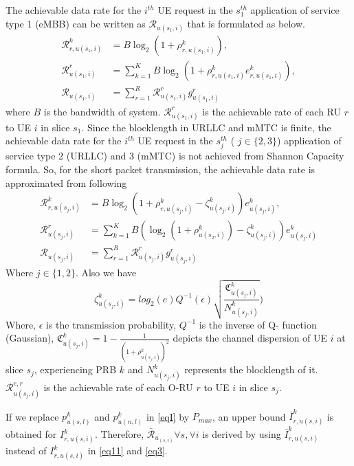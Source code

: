 \documentclass[conference]{IEEEtran}
\begin{document}
The achievable data rate for the $i^{th}$ UE request in the $s_{1}^{th}$ application of service type 1 (eMBB) can be written as $\mathcal{R}_{u(s_1,i)}$ that is formulated as below.
\begin{equation}\label{eq3}
\begin{split}
\mathcal{{R}}_{r,u(s_1,i)}^{k} &=  B \log_2({1+ \rho_{r,u(s_1,i)}^{k}}) ,\\
\mathcal{R}_{u(s_1,i)}^{r} &= \sum_{k=1}^{K} B \log_2({1+ \rho_{r,u(s_1,i)}^{k}} e^k_{r,u(s_1,i)}),\\
\mathcal{R}_{u(s_1,i)} &= \sum_{r=1}^{R}\mathcal{R}_{u(s_1,i)}^{r} g^r_{u(s_1,i)}
\end{split}
\end{equation}
where $B$ is the bandwidth of system. 
$\mathcal{R}_{u(s_1,i)}^{r}$ is the achievable rate of each RU $r$ to UE $i$ in slice $s_1$.
Since the blocklength in URLLC and mMTC is finite, the achievable data rate for the $i^{th}$ UE request in the $s_{j}^{th}$ ( $j \in \{2,3\}$) application of service type 2 (URLLC) and 3 (mMTC) is not achieved from Shannon Capacity formula. So, for the short packet transmission, the achievable data rate is approximated from following
\begin{equation}\label{eq11}
\begin{split}
\mathcal{{R}}_{r,u(s_j,i)}^{k} &= B \log_2({1+ \rho_{r,u(s_j,i)}^{k}} - \zeta_{u(s_j,i)}^{k}){e}_{u(s_j,i)}^{k},\\
\mathcal{R}_{u(s_j,i)}^{r} &= \sum_{k=1}^{K} B (\log_2({1+ \rho_{u(s_2,i)}^{k}})- \zeta_{u(s_j,i)}^{k}){e}_{u(s_j,i)}^{k}\\
\mathcal{R}_{u(s_j,i)} &= \sum_{r=1}^{R}\mathcal{R}_{u(s_j,i)}^{r} g^r_{u(s_j,i)}
\end{split}
\end{equation}
Where $j \in \{1,2\}$. Also we have
\begin{equation}\label{shortPacket}
 \zeta_{u(s_j,i)}^{k} = log_2({e})Q^{-1}(\epsilon) \sqrt{\frac{\mathfrak{C}_{u(s_j,i)}^{k}}{N_{u(s_j,i)}^{k}}})
\end{equation}
Where, $\epsilon $ is the transmission probability, $Q^{-1}$ is the inverse of Q- function (Gaussian),
$\mathfrak{C}_{u(s_j,i)}^{k} = 1 - \frac{1}{(1+\rho_{u(s_j,i)}^{k})^2}$ depicts the channel dispersion of UE  $i$ at slice $s_j$, experiencing PRB $k$ and
$N_{u(s_j,i)}^{k}$ represents the blocklength of it. 
$\mathcal{R}_{u(s_j,i)}^{e,r}$ is the achievable rate of each O-RU $r$ to UE $i$ in slice $s_j$.

If we replace $p_{u(s,l)}^{k}$ and $p_{u(n,l)}^{k}$ in \eqref{eqI} by $P_{max}$, an upper bound $\bar{I}_{r,u(s,i)}^{k}$ is obtained for $I_{r,u(s,i)}^{k}$. Therefore, $\bar{\mathcal{R}}_{u_{(s,i)}} \forall s , \forall i$ is derived by using $\bar{I}_{r,u(s,i)}^{k}$ instead of $I_{r,u(s,i)}^{k}$ in  \eqref{eq11} and \eqref{eq3}.
\end{document}
